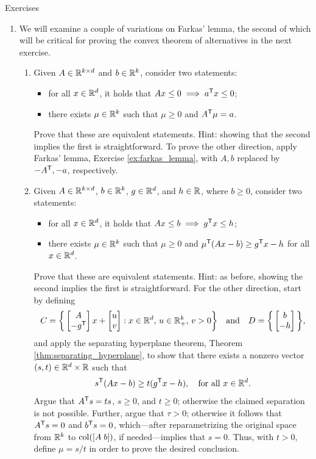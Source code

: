 \begin{xcb}{Exercises}
\begin{enumerate}[label=\thechapter.\arabic*]
\item \label{ex:farkas_variations}
  We will examine a couple of variations on Farkas' lemma, the second of which 
  will be critical for proving the convex theorem of alternatives in the next
  exercise.      

\begin{enumerate}[label=\alph*.]
\item Given $A \in \mathbb{R}^{k \times d}$ and $b \in \mathbb{R}^k$, consider two statements: 
  \begin{itemize}
  \item for all $x \in \mathbb{R}^d$, it holds that $Ax \leq 0 \implies a^{\mathsf{T}} x \leq 0$;  
  \item there exists $\mu \in \mathbb{R}^k$ such that $\mu \geq 0$ and $A^{\mathsf{T}} \mu = 
    a$.
  \end{itemize}
  Prove that these are equivalent statements. Hint: showing that the second  
  implies the first is straightforward. To prove the other direction, apply
  Farkas' lemma, Exercise \ref{ex:farkas_lemma}, with $A,b$ replaced by $-A^{\mathsf{T}},
  -a$, respectively.        

\item Given $A \in \mathbb{R}^{k \times d}$, $b \in \mathbb{R}^k$, $g \in \mathbb{R}^d$, and $h \in \mathbb{R}$,
  where $b \geq 0$, consider two statements:  
  \begin{itemize}
  \item for all $x \in \mathbb{R}^d$, it holds that $Ax \leq b \implies g^{\mathsf{T}} x \leq h$;  
  \item there exists $\mu \in \mathbb{R}^k$ such that $\mu \geq 0$ and $\mu^{\mathsf{T}} (Ax - b) 
    \geq g^{\mathsf{T}} x - h$ for all $x \in \mathbb{R}^d$.
  \end{itemize}
  Prove that these are equivalent statements. Hint: as before, showing the
  second implies the first is straightforward. For the other direction, start by
  defining 
  \[
  C = \bigg\{ \begin{bmatrix} A \\ -g^{\mathsf{T}} \end{bmatrix} x + \begin{bmatrix} u \\     
    v \end{bmatrix} : x \in \mathbb{R}^d, \, u \in \mathbb{R}^k_+, \, v > 0 \bigg\} 
  \quad \text{and} \quad D = \bigg\{ \begin{bmatrix} b \\ -h \end{bmatrix} 
  \bigg\},
  \] 
  and apply the separating hyperplane theorem, Theorem
  \ref{thm:separating_hyperplane}, to show that there exists a nonzero vector
  $(s,t) \in \mathbb{R}^d \times \mathbb{R}$ such that 
  \[
  s^{\mathsf{T}} (Ax - b) \geq t (g^{\mathsf{T}} x - h), \quad \text{for all $x \in \mathbb{R}^d$}.
  \]
  Argue that $A^{\mathsf{T}} s = ts$, $s \geq 0$, and $t \geq 0$; otherwise the claimed
  separation is not possible. Further, argue that $\tau > 0$; otherwise it
  follows that $A^{\mathsf{T}} s = 0$ and $b^{\mathsf{T}} s = 0$, which---after reparametrizing the  
  original space from $\mathbb{R}^k$ to $\operatorname{col}([A \; b])$, if needed---implies that $s = 
  0$. Thus, with $t > 0$, define $\mu = s/t$ in order to prove the desired
  conclusion.           
\end{enumerate}


\end{enumerate}
\end{xcb}

